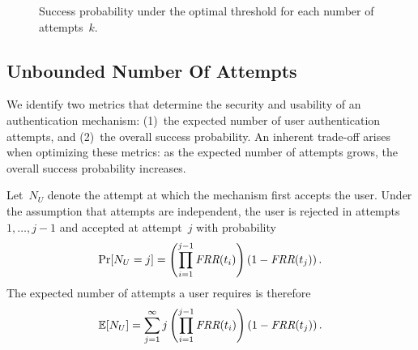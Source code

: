 \documentclass[conference,compsoc]{IEEEtran}
\begin{document}
\begin{figure}[t]
\centering
{}
\caption{Success probability under the optimal threshold for each number of attempts~$k$.}
\label{fig:unconstrained_success_convergence}
\end{figure}

\subsection{Unbounded Number Of Attempts}\label{sec:optimization_mul_attempts}
\noindent
We identify two metrics that determine the security and usability of an authentication mechanism: (1)~the expected number of user authentication attempts, and (2)~the overall success probability. An inherent trade-off arises when optimizing these metrics: as the expected number of attempts grows, the overall success probability increases. 

Let~$N_U$ denote the attempt at which the mechanism first accepts the user. Under the assumption that attempts are independent, the user is rejected in attempts~$1,\ldots,j-1$ and accepted at attempt~$j$ with probability
\begin{equation}\label{eq:fist_success}
\Pr[N_U=j]
=
\left(
\prod_{i=1}^{j-1}\textit{FRR}(t_i)
\right)
\left(1-\textit{FRR}(t_j)\right).
\end{equation}
The expected number of attempts a user requires is therefore
\begin{equation}\label{eq:mean_attempts}
\mathbb{E}[N_U]
=
\sum_{j=1}^{\infty}
j
\left(
\prod_{i=1}^{j-1}\textit{FRR}(t_i)
\right)
\left(1-\textit{FRR}(t_j)\right).
\end{equation}
\end{document}
